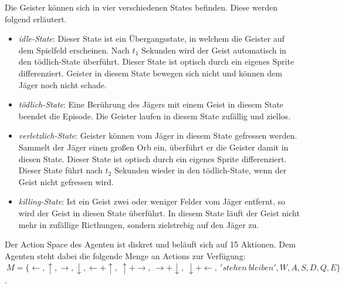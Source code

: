 Die Geister können sich in vier verschiedenen States befinden. Diese werden folgend erläutert.
  \begin{itemize}
    	\item \emph{idle-State}: Dieser State ist ein Übergangsstate, in welchem die Geister auf dem Spielfeld erscheinen. Nach $t_1$ Sekunden wird der Geist automatisch in den tödlich-State überführt. Dieser State ist optisch durch ein eigenes Sprite differenziert. Geister in diesem State bewegen sich nicht und können dem Jäger noch nicht schade. 
  	\item \emph{tödlich-State}: Eine Berührung des Jägers mit einem Geist in diesem State beendet die Episode. Die Geister laufen in diesem State zufällig und ziellos. 
  	\item \emph{verletzlich-State}: Geister können vom Jäger in diesem State gefressen werden. Sammelt der Jäger einen großen Orb ein, überführt er die Geister damit in diesen State. Dieser State ist optisch durch ein eigenes Sprite differenziert. Dieser State führt nach $t_2$ Sekunden wieder in den tödlich-State, wenn der Geist nicht gefressen wird.
  	\item \emph{killing-State}: Ist ein Geist zwei oder weniger Felder vom Jäger entfernt, so wird der Geist in diesen State überführt. In diesem State läuft der Geist nicht mehr in zufällige Ricthungen, sondern zielstrebig auf den Jäger zu. 
  \end{itemize}

Der Action Space des Agenten ist diskret und beläuft sich auf 15 Aktionen. Dem Agenten steht dabei die folgende Menge an Actions zur Verfügung: \\ \newline
$ ~ M = \{ \leftarrow, \uparrow, \rightarrow, \downarrow,  \leftarrow + \uparrow, ~ \uparrow + \rightarrow, ~ \rightarrow + \downarrow, ~\downarrow + \leftarrow, ~'stehen~bleiben', W, A, S, D, Q, E \}$. \newline


